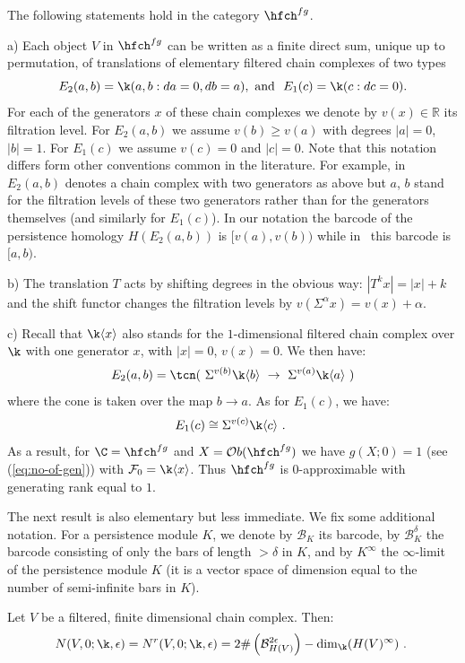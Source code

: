 \begin{ex}\label{ex:element} The following statements hold in the
  category $\hfch^{fg}$.

  a) Each object $V$ in $\hfch^{fg}$ can be written as a finite direct
  sum, unique up to permutation, of translations of elementary
  filtered chain complexes of two types
  $$E_{2}(a, b)=\k(a, b: da=0, db=a), \ \mathrm{and}\ \ E_{1}(c)=\k(c
  : dc=0).$$ For each of the generators $x$ of these chain complexes
  we denote by $v(x) \in \mathbb{R}$ its filtration level. For
  $E_2(a,b)$ we assume $v(b)\geq v(a)$ with degrees $|a|=0$,
  $|b|=1$. For $E_1(c)$ we assume $v(c)=0$ and $|c|=0$. Note
    that this notation differs form other conventions common in the
    literature. For example, in~\cite[Section~2.5.2]{BCZ:tpc}
    $E_2(a,b)$ denotes a chain complex with two generators as above
    but $a$, $b$ stand for the filtration levels of these two
    generators rather than for the generators themselves (and
    similarly for $E_1(c)$). In our notation the barcode of the
    persistence homology $H(E_2(a,b))$ is $[v(a), v(b))$ while
    in~\cite{BCZ:tpc} this barcode is $[a,b)$.

  b) The translation $T$ acts by shifting degrees in the obvious way:
  $|T^{k}x|=|x|+k$ and the shift functor changes the filtration levels
  by $v(\Sigma^{\alpha} x)=v(x)+\alpha$.

  c) Recall that $\k\langle x \rangle$ also stands for the
  $1$-dimensional filtered chain complex over $\k$ with one
    generator $x$, with $|x|=0$, $v(x)=0$. We then have:
  $$E_{2}(a,b)=\tcn (\ \Sigma^{v(b)}\k \langle b \rangle \ \to \
  \Sigma^{v(a)}\k\langle a \rangle\ )$$ where the cone is taken over
  the map $b\to a$. As for $E_1(c)$, we have:
  $$E_{1}(c)\cong \Sigma^{v(c)}\k\langle c \rangle ~.~$$
  As a result, for $\C=\hfch^{fg}$ and $X=\mathcal{O}b(\hfch^{fg})$ we
  have $g(X;0)=1$ (see (\ref{eq:no-of-gen})) with
  $\mathcal{F}_{0}=\k\langle x\rangle $. Thus $\hfch^{fg}$ is
  $0$-approximable with generating rank equal to $1$.
\end{ex}

The next result is also elementary but less immediate. We fix some
additional notation. For a persistence module $K$, we denote by
$\mathcal{B}_{K}$ its barcode, by $\mathcal{B}^{\delta}_{K}$ the
barcode consisting of only the bars of length $> \delta$ in $K$, and
by $K^{\infty}$ the $\infty$-limit of the persistence module $K$ (it
is a vector space of dimension equal to the number of semi-infinite
bars in $K$). 
\begin{lem}\label{lem:noc-chains}
  Let $V$ be a filtered, finite dimensional chain complex.  Then:
  \begin{equation}\label{eq:identi} N(V,0;\k,\epsilon)=
    N^{r}(V,0;\k,\epsilon)= 2\#
    \left(\mathcal{B}^{2\epsilon}_{H(V)}\right) - \dim_{\k}
    (H(V)^{\infty}) ~.~
  \end{equation}
\end{lem}

